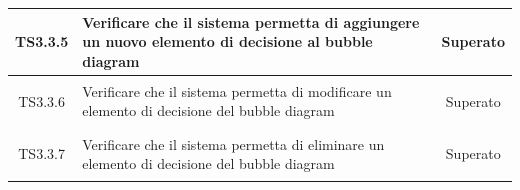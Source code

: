 \documentclass[../PianoDiQualifica.tex]{subfiles}
\begin{document}
\begin{longtable}{|c|>{\centering}p{10cm}|c|}
	\hline
	\hypertarget{TS3.3.5}{TS3.3.5} & Verificare che il sistema permetta di aggiungere un nuovo elemento di decisione al bubble diagram & Superato \\
	\hline
	\hypertarget{TS3.3.6}{TS3.3.6} & Verificare che il sistema permetta di modificare un elemento di decisione del bubble diagram  & Superato \\
	\hline
	\hypertarget{TS3.3.7}{TS3.3.7} & Verificare che il sistema permetta di eliminare un elemento di decisione del bubble diagram & Superato \\

\end{longtable}
\end{document}
